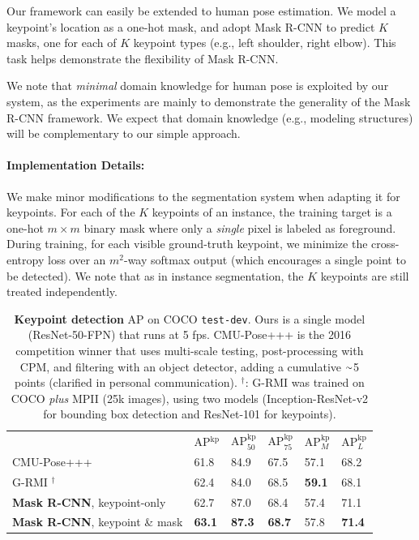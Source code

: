 Our framework can easily be extended to human pose estimation. We model a keypoint's location as a one-hot mask, and adopt Mask R-CNN to predict $K$ masks, one for each of $K$ keypoint types (e.g., left shoulder, right elbow). This task helps demonstrate the flexibility of Mask R-CNN.

We note that \emph{minimal} domain knowledge for human pose is exploited by our system, as the experiments are mainly to demonstrate the generality of the Mask R-CNN framework. We expect that domain knowledge (e.g., modeling structures) will be complementary to our simple approach.

\paragraph{Implementation Details:} We make minor modifications to the segmentation system when adapting it for keypoints. For each of the $K$ keypoints of an instance, the training target is a one-hot $m \times m$ binary mask where only a \emph{single} pixel is labeled as foreground. During training, for each visible ground-truth keypoint, we minimize the cross-entropy loss over an $m^2$-way softmax output (which encourages a single point to be detected). We note that as in instance segmentation, the $K$ keypoints are still treated independently.

\begin{table}[t]
\begin{tabular}{l|x{22}x{22}x{22}|x{22}x{22}}
  & AP$^\text{kp}$ & AP$^\text{kp}_{50}$ & AP$^\text{kp}_{75}$
  & AP$^\text{kp}_M$ &  AP$^\text{kp}_L$\\ [.1em]
\shline
CMU-Pose+++  & 61.8 & 84.9 & 67.5 & 57.1 & 68.2 \\
G-RMI $^\dagger$ & 62.4 & 84.0 & 68.5 & \textbf{59.1} & 68.1 \\
\hline
  \textbf{Mask R-CNN}, \footnotesize keypoint-only & 62.7 & 87.0 & 68.4 & 57.4 & 71.1 \\
  \textbf{Mask R-CNN}, \footnotesize keypoint \& mask & \textbf{63.1} & \textbf{87.3} & \textbf{68.7} & {57.8} & \textbf{71.4} \\
\end{tabular}
\caption{\textbf{Keypoint detection} AP on COCO \texttt{test-dev}. Ours is a single model (ResNet-50-FPN) that runs at 5 fps. CMU-Pose+++ is the 2016 competition winner that uses multi-scale testing, post-processing with CPM, and filtering with an object detector, adding a cumulative $\app$5 points (clarified in personal communication). $^\dagger$: G-RMI was trained on COCO \emph{plus} MPII (25k images), using two models (Inception-ResNet-v2 for bounding box detection and ResNet-101 for keypoints).}
\label{tab:final_keypoint}
\end{table}

